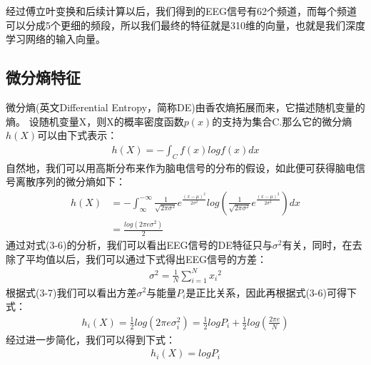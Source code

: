 	经过傅立叶变换和后续计算以后，我们得到的EEG信号有62个频道，而每个频道可以分成5个更细的频段，所以我们最终的特征就是310维的向量，也就是我们深度学习网络的输入向量。
	\subsection{微分熵特征}
	微分熵(英文Differential Entropy，简称DE)由香农熵拓展而来，它描述随机变量的熵。
	设随机变量X，则X的概率密度函数$p(x)$的支持为集合C.那么它的微分熵$h(X)$可以由下式表示：
	\begin{align}
	h(X) = -\int_C f(x)logf(x)dx
	\end{align}
	自然地，我们可以用高斯分布来作为脑电信号的分布的假设，如此便可获得脑电信号离散序列的微分熵如下：
	\begin{align}
	h(X) &=  -\int_{\infty}^{-\infty} {\frac{1}{\sqrt{2\pi \sigma^2}} e^{\frac{{(x-\mu)}^2}{2\sigma^2}}log(\frac{1}{\sqrt{2\pi \sigma^2}}e^{\frac{{(x-\mu)}^2}{2\sigma^2}})dx} \\
	&=\frac{log(2\pi e \sigma^2)}{2}
	\end{align}
	通过对式(3-6)的分析，我们可以看出EEG信号的DE特征只与$\sigma^2$有关，同时，在去除了平均值以后，我们可以通过下式得出EEG信号的方差：
	\begin{align}
	\sigma^2 = \frac{1}{N} \sum_{i=1}^{N}{{x_i}^2}
	\end{align}
	根据式(3-7)我们可以看出方差$\sigma^2$与能量$P_i$是正比关系，因此再根据式(3-6)可得下式：
	\begin{align}
	h_i(X) = \frac{1}{2}log(2\pi e \sigma_i^2) = \frac{1}{2}log P_i + \frac{1}{2}log(\frac{2\pi e}{N})
	\end{align}
	经过进一步简化，我们可以得到下式：\\
	\begin{align}
	h_i(X) = log P_i
	\end{align}
	